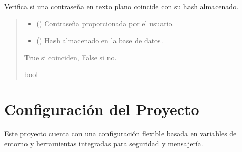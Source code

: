 \documentclass[letterpaper,10pt,spanish]{sphinxmanual}
\begin{document}

\begin{fulllineitems}
\label{\detokenize{modelos:main.verificar_password}}
\pysigstartsignatures
\pysiglinewithargsret
{}
{\sphinxparamcomma {}}
{}
\pysigstopsignatures
\sphinxAtStartPar
Verifica si una contraseña en texto plano coincide con su hash almacenado.
\begin{quote}\begin{description}
\begin{itemize}
\item {} 
\sphinxAtStartPar
{} () \textendash{} Contraseña proporcionada por el usuario.

\item {} 
\sphinxAtStartPar
{} () \textendash{} Hash almacenado en la base de datos.

\end{itemize}

\sphinxAtStartPar
True si coinciden, False si no.

\sphinxAtStartPar
bool

\end{description}\end{quote}

\end{fulllineitems}


\sphinxstepscope


\chapter{Configuración del Proyecto}
\label{\detokenize{configuracion:configuracion-del-proyecto}}\label{\detokenize{configuracion::doc}}
\sphinxAtStartPar
Este proyecto cuenta con una configuración flexible basada en variables de entorno y herramientas integradas para seguridad y mensajería.
\end{document}
